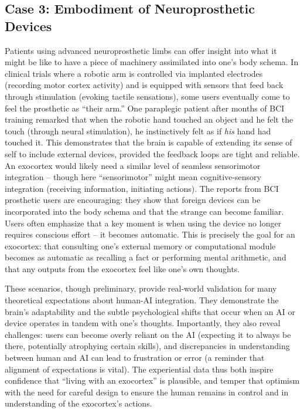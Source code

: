 \documentclass[11pt]{article}
\newcommand{\quotes}[1]{``#1''}
\begin{document}
\subsection*{Case 3: Embodiment of Neuroprosthetic Devices}
Patients using advanced neuroprosthetic limbs can offer insight into what it might be like to have a piece of machinery assimilated into one's body schema. In clinical trials where a robotic arm is controlled via implanted electrodes (recording motor cortex activity) and is equipped with sensors that feed back through stimulation (evoking tactile sensations), some users eventually come to feel the prosthetic as \quotes{their arm.} One paraplegic patient after months of BCI training remarked that when the robotic hand touched an object and he felt the touch (through neural stimulation), he instinctively felt as if \textit{his} hand had touched it. This demonstrates that the brain is capable of extending its sense of self to include external devices, provided the feedback loops are tight and reliable. An exocortex would likely need a similar level of seamless sensorimotor integration -- though here \quotes{sensorimotor} might mean cognitive-sensory integration (receiving information, initiating actions). The reports from BCI prosthetic users are encouraging: they show that foreign devices can be incorporated into the body schema and that the strange can become familiar. Users often emphasize that a key moment is when using the device no longer requires conscious effort -- it becomes automatic. This is precisely the goal for an exocortex: that consulting one's external memory or computational module becomes as automatic as recalling a fact or performing mental arithmetic, and that any outputs from the exocortex feel like one's own thoughts.

These scenarios, though preliminary, provide real-world validation for many theoretical expectations about human-AI integration. They demonstrate the brain's adaptability and the subtle psychological shifts that occur when an AI or device operates in tandem with one's thoughts. Importantly, they also reveal challenges: users can become overly reliant on the AI (expecting it to always be there, potentially atrophying certain skills), and discrepancies in understanding between human and AI can lead to frustration or error (a reminder that alignment of expectations is vital). The experiential data thus both inspire confidence that \quotes{living with an exocortex} is plausible, and temper that optimism with the need for careful design to ensure the human remains in control and in understanding of the exocortex's actions.
\end{document}
